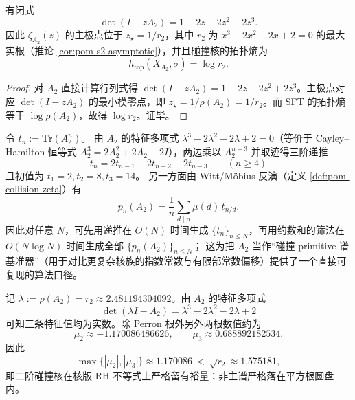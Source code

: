 \begin{proposition}[碰撞核的行列式与主极点]\label{prop:pom-collision-det}
有闭式
$$
\det(I-zA_2)=1-2z-2z^2+2z^3.
$$
因此 \(\zeta_{A_2}(z)\) 的主极点位于 \(z_\star=1/r_2\)，其中 \(r_2\) 为 \(x^3-2x^2-2x+2=0\) 的最大实根（推论 \ref{cor:pom-s2-asymptotic}），并且碰撞核的拓扑熵为
$$
h_{\mathrm{top}}(X_{A_2},\sigma)=\log r_2.
$$
\end{proposition}
\begin{proof}
对 \(A_2\) 直接计算行列式得 \(\det(I-zA_2)=1-2z-2z^2+2z^3\)。主极点对应 \(\det(I-zA_2)\) 的最小模零点，即 \(z_\star=1/\rho(A_2)=1/r_2\)。而 SFT 的拓扑熵等于 \(\log\rho(A_2)\)，故得 \(\log r_2\)。证毕。
\end{proof}

\begin{remark}\label{rem:pom-a2-primitive-fast}
令 \(t_n:=\mathrm{Tr}(A_2^n)\)。
由 \(A_2\) 的特征多项式 \(\lambda^3-2\lambda^2-2\lambda+2=0\)（等价于 Cayley--Hamilton 恒等式 \(A_2^3=2A_2^2+2A_2-2I\)），两边乘以 \(A_2^{n-3}\) 并取迹得三阶递推
\[
\boxed{\;
t_n=2t_{n-1}+2t_{n-2}-2t_{n-3}\qquad(n\ge 4)\;}
\]
且初值为 \(t_1=2,t_2=8,t_3=14\)。
另一方面由 Witt/Möbius 反演（定义 \ref{def:pom-collision-zeta}）有
\[
p_n(A_2)=\frac{1}{n}\sum_{d\mid n}\mu(d)\,t_{n/d}.
\]
因此对任意 \(N\)，可先用递推在 \(O(N)\) 时间生成 \(\{t_n\}_{n\le N}\)，再用约数和的筛法在 \(O(N\log N)\) 时间生成全部 \(\{p_n(A_2)\}_{n\le N}\)；
这为把 \(A_2\) 当作“碰撞 primitive 谱基准器”（用于对比更复杂核族的指数常数与有限部常数偏移）提供了一个直接可复现的算法口径。
\end{remark}

\begin{remark}\label{rem:pom-collision-rh-margin}
记 \(\lambda:=\rho(A_2)=r_2\approx 2.481194304092\)。由 \(A_2\) 的特征多项式
\[
\det(\lambda I-A_2)=\lambda^3-2\lambda^2-2\lambda+2
\]
可知三条特征值均为实数。除 Perron 根外另外两根数值约为
\[
\mu_2\approx -1.170086486626,\qquad
\mu_3\approx 0.688892182534.
\]
因此
\[
\max\{|\mu_2|,|\mu_3|\}\approx 1.170086\ <\ \sqrt{r_2}\approx 1.575181,
\]
即二阶碰撞核在核版 RH 不等式上严格留有裕量：非主谱严格落在平方根圆盘内。
\end{remark}

